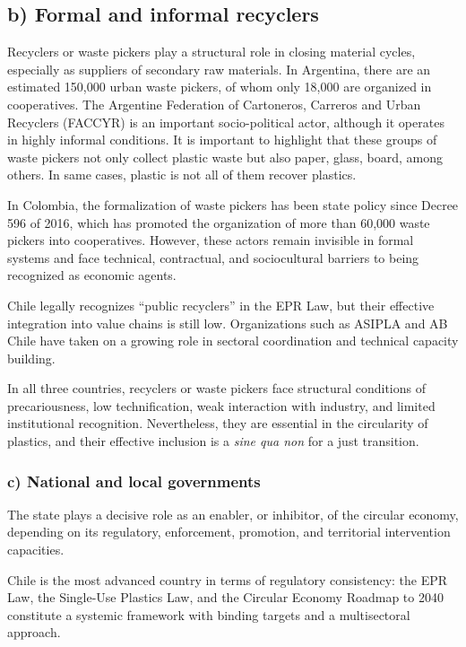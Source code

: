 \documentclass[
  12pt,
  oneside]{book}
\begin{document}
\subsection{b) Formal and informal
recyclers}\label{b-formal-and-informal-recyclers}

Recyclers or waste pickers play a structural role in closing material
cycles, especially as suppliers of secondary raw materials. In
Argentina, there are an estimated 150,000 urban waste pickers, of whom
only 18,000 are organized in cooperatives. The Argentine Federation of
Cartoneros, Carreros and Urban Recyclers (FACCYR) is an important
socio-political actor, although it operates in highly informal
conditions. It is important to highlight that these groups of waste
pickers not only collect plastic waste but also paper, glass, board,
among others. In same cases, plastic is not all of them recover
plastics.

In Colombia, the formalization of waste pickers has been state policy
since Decree 596 of 2016, which has promoted the organization of more
than 60,000 waste pickers into cooperatives. However, these actors
remain invisible in formal systems and face technical, contractual, and
sociocultural barriers to being recognized as economic agents.

Chile legally recognizes ``public recyclers'' in the EPR Law, but their
effective integration into value chains is still low. Organizations such
as ASIPLA and AB Chile have taken on a growing role in sectoral
coordination and technical capacity building.

In all three countries, recyclers or waste pickers face structural
conditions of precariousness, low technification, weak interaction with
industry, and limited institutional recognition. Nevertheless, they are
essential in the circularity of plastics, and their effective inclusion
is a \emph{sine qua non} for a just transition.

\subsubsection{c) National and local
governments}\label{c-national-and-local-governments}

The state plays a decisive role as an enabler, or inhibitor, of the
circular economy, depending on its regulatory, enforcement, promotion,
and territorial intervention capacities.

Chile is the most advanced country in terms of regulatory consistency:
the EPR Law, the Single-Use Plastics Law, and the Circular Economy
Roadmap to 2040 constitute a systemic framework with binding targets and
a multisectoral approach.
\end{document}
